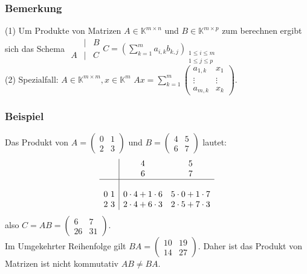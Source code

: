 \subsubsection{Bemerkung}
(1) Um Produkte von Matrizen $A\in \mathbb{K}^{m\times n}$ und $B\in \mathbb{K}^{m\times p}$ zum berechnen ergibt sich das Schema $\begin{array}{ccc} & | & B\\A & | & C\end{array} C=(\sum^{m}_{k=1} a_{i,k}b_{k,j})_{\substack{1\leq i\leq m\\1\leq j\leq p}}$\\
(2) Spezialfall: $A\in \mathbb{K}^{m\times m},x\in \mathbb{K}^m$ $Ax=\sum^{m}_{k=1}\left(\begin{array}{cc}a_{1,k}&x_{1}\\\vdots & \vdots \\ a_{m,k} & x_k\end{array}\right)$.
\subsubsection{Beispiel}
Das Produkt von $A=\left(\begin{array}{cc}0 & 1\\ 2 & 3\end{array}\right)$ und $B=\left(\begin{array}{cc}4 & 5 \\ 6 & 7\end{array}\right)$ lautet:
\[\begin{array}{c|cc} & \begin{matrix}4\\ 6\end{matrix} & \begin{matrix} 5\\ 7\end{matrix} \\ \hline \\0\ 1 & 0\cdot 4+1\cdot 6 & 5\cdot 0 + 1\cdot 7 \\ 2\ 3 & 2\cdot 4+6\cdot 3 & 2\cdot 5+7\cdot 3\end{array}\] also $C=AB=\left(\begin{array}{cc}6 & 7 \\ 26 & 31\end{array}\right)$.\\
Im Umgekehrter Reihenfolge gilt $BA=\left(\begin{array}{cc} 10 & 19 \\ 14 & 27\end{array}\right)$.  Daher ist das Produkt von Matrizen ist nicht kommutativ $AB\not= BA$.
